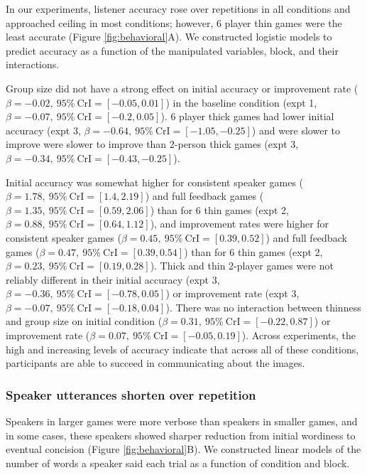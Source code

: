 \documentclass[
  english,
  a4paper,
]{article}
\begin{document}
In our experiments, listener accuracy rose over repetitions in all conditions and approached ceiling in most conditions; however, 6 player thin games were the least accurate (Figure \ref{fig:behavioral}A). We constructed logistic models to predict accuracy as a function of the manipulated variables, block, and their interactions.

Group size did not have a strong effect on initial accuracy or improvement rate (\(\beta=-0.02,\:95\%\:\mathrm{CrI}=[-0.05, 0.01]\)) in the baseline condition (expt 1, \(\beta=-0.07,\:95\%\:\mathrm{CrI}=[-0.2, 0.05]\)). 6 player thick games had lower initial accuracy (expt 3, \(\beta=-0.64,\:95\%\:\mathrm{CrI}=[-1.05, -0.25]\)) and were slower to improve were slower to improve than 2-person thick games (expt 3, \(\beta=-0.34,\:95\%\:\mathrm{CrI}=[-0.43, -0.25]\)).

Initial accuracy was somewhat higher for consistent speaker games (\(\beta=1.78,\:95\%\:\mathrm{CrI}=[1.4, 2.19]\)) and full feedback games (\(\beta=1.35,\:95\%\:\mathrm{CrI}=[0.59, 2.06]\)) than for 6 thin games (expt 2, \(\beta=0.88,\:95\%\:\mathrm{CrI}=[0.64, 1.12]\)), and improvement rates were higher for consistent speaker games (\(\beta=0.45,\:95\%\:\mathrm{CrI}=[0.39, 0.52]\)) and full feedback games (\(\beta=0.47,\:95\%\:\mathrm{CrI}=[0.39, 0.54]\)) than for 6 thin games (expt 2, \(\beta=0.23,\:95\%\:\mathrm{CrI}=[0.19, 0.28]\)). Thick and thin 2-player games were not reliably different in their initial accuracy (expt 3, \(\beta=-0.36,\:95\%\:\mathrm{CrI}=[-0.78, 0.05]\)) or improvement rate (expt 3, \(\beta=-0.07,\:95\%\:\mathrm{CrI}=[-0.18, 0.04]\)). There was no interaction between thinness and group size on initial condition (\(\beta=0.31,\:95\%\:\mathrm{CrI}=[-0.22, 0.87]\)) or improvement rate (\(\beta=0.07,\:95\%\:\mathrm{CrI}=[-0.05, 0.19]\)). Across experiments, the high and increasing levels of accuracy indicate that across all of these conditions, participants are able to succeed in communicating about the images.

\hypertarget{speaker-utterances-shorten-over-repetition}{%
\subsubsection{Speaker utterances shorten over repetition}\label{speaker-utterances-shorten-over-repetition}}

Speakers in larger games were more verbose than speakers in smaller games, and in some cases, these speakers showed sharper reduction from initial wordiness to eventual concision (Figure \ref{fig:behavioral}B). We constructed linear models of the number of words a speaker said each trial as a function of condition and block.
\end{document}
